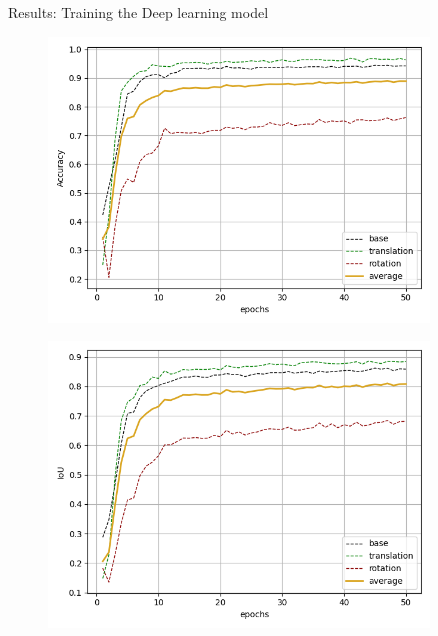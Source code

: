 \documentclass{beamer}
\begin{document}
\begin{frame}{Results: Training the Deep learning model}
\begin{minipage}{\textwidth}
\begin{minipage}{0.66\textwidth}
    \end{minipage}
    \hfill
    \begin{minipage}{0.33\textwidth}
        \begin{figure}
            \centering
            \includegraphics[width = 0.9\textwidth]{img/seg_noise_train_acc.png}
        \end{figure}
        \begin{figure}
            \centering
            \includegraphics[width = 0.9\textwidth]{img/seg_noise_train_iou.png}
        \end{figure}
    \end{minipage}
\end{minipage}
\end{frame}
\end{document}
